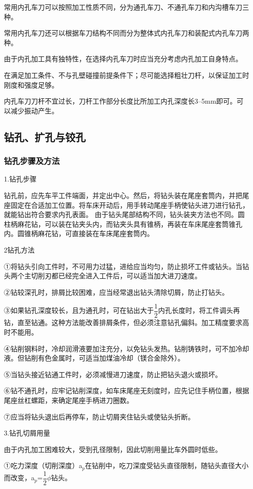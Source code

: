 \documentclass{ctexbook}
\begin{document}
常用内孔车刀可以按照加工性质不同，分为通孔车刀、不通孔车刀和内沟槽车刀三种。

常用内孔车刀还可以根据车刀结构不同而分为整体式内孔车刀和装配式内孔车刀两种。

由于内孔加工具有独特性，在选择内孔车刀时应当充分考虑内孔加工自身特点。

在满足加工条件、不与孔壁碰撞前提条件下；尽可能选择粗壮刀杆，以保证加工时刚度和强度足够。

内孔车刀刀杆不宜过长，刀杆工作部分长度比所加工内孔深度长3--5mm即可。可以减少振动产生。
\subsection{钻孔、扩孔与铰孔}
\subsubsection{钻孔步骤及方法}
1.钻孔步骤

钻孔前，应先车平工件端面，并定出中心。然后，将钻头装在尾座套筒内，并把尾座固定在合适加工位置。将车床开动后，用手转动尾座手柄使钻头进刀进行钻孔，就能钻出符合要求内孔表面。
由于钻头尾部结构不同，钻头装夹方法也不同。圆柱柄麻花钻，可以装在钻夹头内，而钻夹头具有锥柄，再装在车床尾座套筒锥孔内。圆锥柄麻花钻，可直接装在车床尾座套筒内。

2钻孔方法

①将钻头引向工件时，不可用力过猛，进给应当均匀，防止损坏工件或钻头。当钻头两个主切削刃都已经完全进入工件后，可以适当加大进刀速度。

②钻较深孔时，排屑比较困难，应当经常退出钻头清除切屑，防止打钻头。

③如果钻孔深度较长，且为通孔时，可在钻出大于$\dfrac{1}{2}$内孔长度时，将工件调头再钻，直至钻通。这种方法能改善排屑条件，但必须注意钻孔偏斜。加工精度要求高时不能用。

④钻削钢料时，冷却润滑液要加注充分，以免钻头发热。钻削铸铁时，可不加冷却液。但钻削有色金属时，可适当加煤油冷却（镁合金除外）。

⑤当钻头接近钻通工件时，必须减慢进刀速度，防止把钻头退火或损坏。

⑥钻不通孔时，应牢记钻削深度，如车床尾座无刻度时，应先记住手柄位置，根据尾座丝杠螺距，来确定尾座手柄进刀圈数。

⑦应当将钻头退出后再停车，防止切屑夹住钻头或使钻头折断。

3.钻孔切屑用量

由于内孔加工困难较大，受到孔径限制，因此切削用量比车外圆时低些。

①吃力深度（切削深度）a$_p$在钻削中，吃刀深度受钻头直径限制，随钻头直径大小而改变，a$_p$=$\dfrac{1}{2}\phi$钻头。
\end{document}

